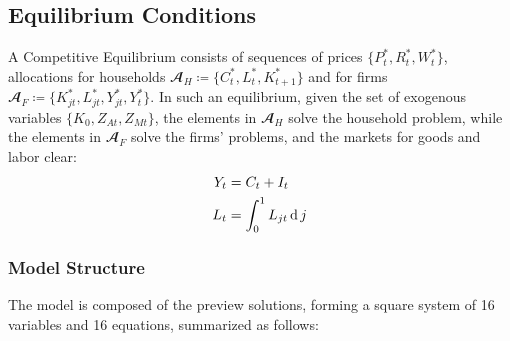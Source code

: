 \documentclass[../thesis.tex]{subfiles}
\begin{document}
	\subsection{Equilibrium Conditions}
	
	
	A Competitive Equilibrium consists of sequences of prices $\{P_t^\ast, R_t^\ast, W_t^\ast\}$, allocations for households $\mathbfscr{A}_H \coloneq \{C_t^\ast, L_t^\ast, K_{t+1}^\ast\}$ and for firms $\mathbfscr{A}_F \coloneq \{K_{jt}^\ast, L_{jt}^\ast, Y_{jt}^\ast, Y_t^\ast\}$. In such an equilibrium, given the set of exogenous variables $\{K_0, Z_{At}, Z_{Mt}\}$, the elements in $\mathbfscr{A}_H$ solve the household problem, while the elements in $\mathbfscr{A}_F$ solve the firms' problems, and the markets for goods and labor clear:
	\begin{align}
		Y_t &= C_t + I_t \label{eq_v0:market-clearing-condition} \\
		L_t &= \int_{0}^{1} L_{jt} \operatorname{d} j \label{eq_v0:market-clearing-condition-2}
	\end{align}
	
	
	
	\subsubsection{Model Structure}
	
	The model is composed of the preview solutions, forming a square system of 16 variables and 16 equations, summarized as follows:
	
\end{document}

